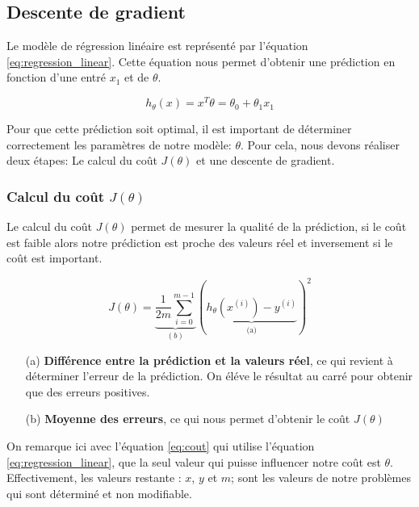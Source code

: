 \subsection{Descente de gradient}

Le modèle de régression linéaire est représenté par l'équation \ref{eq:regression_linear}. Cette équation nous permet d'obtenir une prédiction en fonction d'une entré $x_1$ et de $\theta$.

\begin{equation}\label{eq:regression_linear}
    h_\theta(x) = x^T \theta =\theta_0 + \theta_1 x_1
\end{equation}

\noindent
Pour que cette prédiction soit optimal, il est important de déterminer correctement les paramètres de notre modèle: $\theta$. Pour cela, nous devons réaliser deux étapes: Le calcul du coût $J(\theta)$ et une descente de gradient.
    
\subsubsection{Calcul du coût $J(\theta)$}
Le calcul du coût $J(\theta)$ permet de mesurer la qualité de la prédiction, si le coût est faible alors notre prédiction est proche des valeurs réel et inversement si le coût est important.

\begin{equation}\label{eq:cout}
   J(\theta) = \underbrace{\frac{1}{2m} \sum_{i=0}^{m-1}}_{(b)}(\underbrace{h_\theta(x^{(i)}) - y^{(i)}}_{\text{(a)}})^2
\end{equation}

\begin{itemize}
    \item [(a)] \textbf{Différence entre la prédiction et la valeurs réel}, ce qui revient à déterminer l'erreur de la prédiction. On éléve le résultat au carré pour obtenir que des erreurs positives.
    \item [(b)] \textbf{Moyenne des erreurs}, ce qui nous permet d'obtenir le coût $J(\theta)$
\end{itemize}

\vspace{.3cm}

On remarque ici avec l'équation \ref{eq:cout} qui utilise l'équation \ref{eq:regression_linear}, que la seul valeur qui puisse influencer notre coût est $\theta$. Effectivement, les valeurs restante : $x$, $y$ et $m$; sont les valeurs
de notre problèmes qui sont déterminé et non modifiable.


